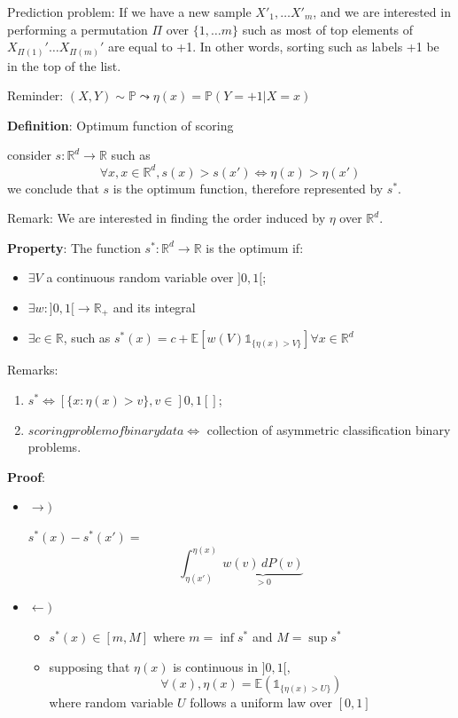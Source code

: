 			Prediction problem: If we have a new sample $X'_1, \ldots X'_m$, and we are interested in performing a permutation $\Pi$ over $\{1,\ldots m\}$ such as most of top elements of $X_{\Pi(1)}' \ldots X_{\Pi (m)}'$ are equal to +1. In other words, sorting such as labels +1 be in the top of the list. 

			Reminder: $(X,Y)\sim\mathbb{P}\leadsto\eta(x)=\mathbb{P}(Y=+1|X=x)$

			\textbf{Definition}: Optimum function of scoring

			consider $s:\mathbb{R}^d\rightarrow\mathbb{R}$ such as 
			\[
				\forall x, x\in \mathbb{R}^d, s(x)>s(x') \Leftrightarrow\eta(x)>\eta(x')
			\] 
			we conclude that $s$ is the optimum function, therefore represented by $s^*$.

			Remark: We are interested in finding the order induced by $\eta$ over $\mathbb{R}^d$.

			\textbf{Property}: The function $s^*:\mathbb{R}^d\rightarrow\mathbb{R}$ is the optimum if:

			\begin{itemize}
				\item $\exists V$ a continuous random variable over $]0,1[$;
				\item $\exists w:]0,1[\rightarrow\mathbb{R}_+$ and its integral
				\item $\exists c\in\mathbb{R}$, such as $s^*(x)=c+\mathbb{E}[w(V)\mathds{1}_{\{\eta(x)>V\}}]\forall x\in\mathbb{R}^d$ 
			\end{itemize}

			Remarks:
			\begin{enumerate}[i]%
				\item $s^*\Leftrightarrow[\{x:\eta(x)>v\}, v\in]0,1[]$;
				\item $scoring problem of binary data \Leftrightarrow$ collection of asymmetric classification binary problems.
			\end{enumerate}

			\textbf{Proof}: 

			\begin{itemize}
				\item $\rightarrow) $

								$s^*(x)-s^*(x') = $
								\[
									\int_{\eta(x')}^{\eta(x)} \underbrace{w(v)\,dP(v)}_{>0}
								\]

				\item $\leftarrow) $ 

					\begin{itemize}
						\item $s^*(x)\in[m,M]$ where $m=\operatorname{inf}s^*$ and $M=\operatorname{sup}s^*$
						\item supposing that $\eta(x)$ is continuous in $]0,1[,$
								\[
 									\forall(x), \eta(x)=\mathbb{E}(\mathds{1}_{\{\eta(x)>U\}})
								\]
								where random variable $U$ follows a uniform law over $[0,1]$
					\end{itemize}

			\end{itemize}
			
